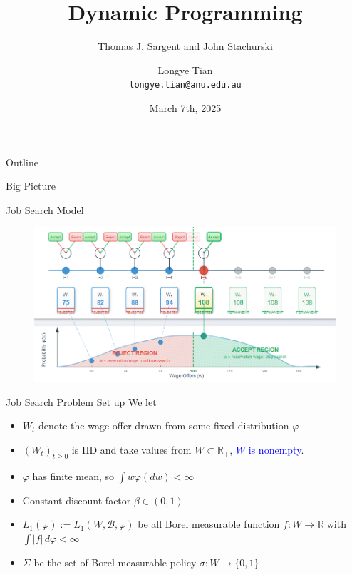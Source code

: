 \documentclass[aspectratio=169]{beamer} %
\title[DP2]{Dynamic Programming}
\subtitle{Thomas J. Sargent and John Stachurski}
\author[Longye]{Longye Tian \\ \texttt{longye.tian@anu.edu.au}}
\institute[ANU]{Australian National University\\ School of Economics}
\date{March 7th, 2025}
\begin{document}
\begin{frame}
  \titlepage
\end{frame}

\begin{frame}{Outline}
  \tableofcontents
\end{frame}

\begin{frame}{Big Picture}
    
\end{frame}

\begin{frame}{Job Search Model}
    \begin{figure}
        \centering
        \includegraphics[width=0.95\linewidth]{Dynamic Programming/DP2/Chapter 4/Section 4.1.1. Job Search/Job Search Model.png}
    \end{figure}
\end{frame}


\begin{frame}{Job Search Problem Set up}
    We let 
    \begin{itemize}
        \item $W_t$ denote the wage offer drawn from some fixed distribution $\varphi$
        \item $(W_t)_{t\ge 0}$ is IID and take values from $W\subset \mathbb{R}_+$, \textcolor{blue}{$W$ is nonempty}.
        \item $\varphi$ has finite mean, so $\int w\varphi(dw)<\infty$
        \item Constant discount factor $\beta\in(0,1)$
        \item $L_1(\varphi):= L_1(W,\mathscr{B}, \varphi)$ be all Borel measurable function $f:W\to \mathbb{R}$ with $\int|f|\,d\varphi<\infty$
        \item $\Sigma$ be the set of Borel measurable policy $\sigma: W\to \{0,1\}$
    \end{itemize}
\end{frame}
\end{document}

